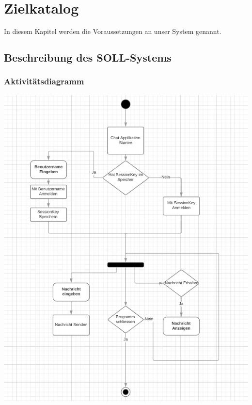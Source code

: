 \documentclass[12pt]{article}
\begin{document}
  \section{Zielkatalog}
    In diesem Kapitel werden die Voraussetzungen an unser System genannt.
    \subsection{Beschreibung des SOLL-Systems}
      \subsubsection{Aktivitätsdiagramm}
        {\centering\includegraphics[height=0.9\textheight]{activity-diagram.png}}
\end{document}
